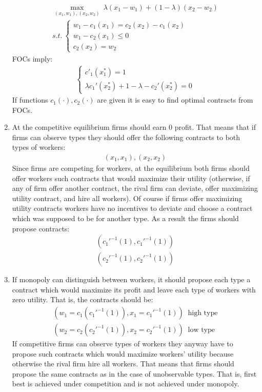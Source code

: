 \documentclass[a4paper]{article}
\begin{document}
\begin{enumerate}
	\begin{align*}
	\underset{(x_1, w_1), (x_2, w_2)}{\max}\ \lambda(x_1 - w_1) + (1 - \lambda) (x_2 - w_2)\\
	s.t.\ \begin{cases}
	w_1 - c_1(x_1) = c_2(x_2) - c_1(x_2)\\
	w_1 - c_2(x_1) \le 0\\
	c_2(x_2) = w_2
	\end{cases}
	\end{align*}
	FOCs imply:
	\begin{align*}
	\begin{cases}
	c'_1(x_1^*) = 1\\
	\lambda c_1'(x_2^*) + 1 - \lambda - c_2'(x_2^*) = 0
	\end{cases}
	\end{align*}
	If functions $c_1(\cdot), c_2(\cdot)$ are given it is easy to find optimal contracts from FOCs.
	\item At the competitive equilibrium firms should earn 0 profit. That means that if firms can observe types they should offer the following contracts to both types of workers:
	\begin{align*}
	(x_1, x_1), (x_2, x_2)
	\end{align*}
	Since firms are competing for workers, at the equilibrium both firms should offer workers such contracts that would maximize their utility (otherwise, if any of firm offer another contract, the rival firm can deviate, offer maximizing utility contract, and hire all workers). Of course if firms offer maximizing utility contracts workers have no incentives to deviate and choose a contract which was supposed to be for another type. As a result the firms should propose contracts:
	\begin{align*}
	(c_1'^{-1}(1), c_1'^{-1}(1))\\
	(c_2'^{-1}(1), c_2'^{-1}(1))
	\end{align*}
	\item If monopoly can distinguish between workers, it should propose each type a contract which would maximize its profit and leave each type of workers with zero utility. That is, the contracts should be:
	\begin{align*}
	(w_1 = c_1(c_1'^{-1}(1)), x_1 = c_1'^{-1}(1))\ \text{ high type}\\
	(w_2 = c_2(c_2'^{-1}(1)), x_2 = c_2'^{-1}(1))\ \text{ low type}
	\end{align*}
	If competitive firms can observe types of workers they anyway have to propose such contracts which would maximize workers' utility because otherwise the rival firm hire all workers. That means that firms should propose the same contracts as in the case of unobservable types. That is, first best is achieved under competition and is not achieved under monopoly.

\end{enumerate}
\end{document}
